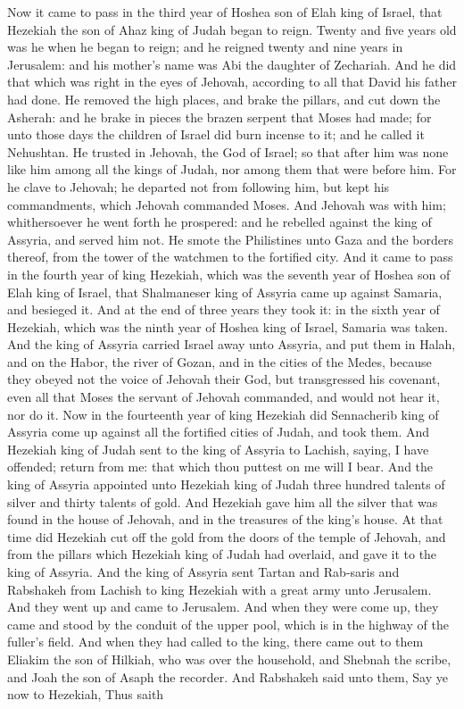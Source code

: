 Now it came to pass in the third year of Hoshea son of Elah king of Israel, that Hezekiah the son of Ahaz king of Judah began to reign. Twenty and five years old was he when he began to reign; and he reigned twenty and nine years in Jerusalem: and his mother’s name was Abi the daughter of Zechariah. And he did that which was right in the eyes of Jehovah, according to all that David his father had done. He removed the high places, and brake the pillars, and cut down the Asherah: and he brake in pieces the brazen serpent that Moses had made; for unto those days the children of Israel did burn incense to it; and he called it Nehushtan. He trusted in Jehovah, the God of Israel; so that after him was none like him among all the kings of Judah, nor among them that were before him. For he clave to Jehovah; he departed not from following him, but kept his commandments, which Jehovah commanded Moses. And Jehovah was with him; whithersoever he went forth he prospered: and he rebelled against the king of Assyria, and served him not. He smote the Philistines unto Gaza and the borders thereof, from the tower of the watchmen to the fortified city.  And it came to pass in the fourth year of king Hezekiah, which was the seventh year of Hoshea son of Elah king of Israel, that Shalmaneser king of Assyria came up against Samaria, and besieged it. And at the end of three years they took it: in the sixth year of Hezekiah, which was the ninth year of Hoshea king of Israel, Samaria was taken. And the king of Assyria carried Israel away unto Assyria, and put them in Halah, and on the Habor, the river of Gozan, and in the cities of the Medes, because they obeyed not the voice of Jehovah their God, but transgressed his covenant, even all that Moses the servant of Jehovah commanded, and would not hear it, nor do it.  Now in the fourteenth year of king Hezekiah did Sennacherib king of Assyria come up against all the fortified cities of Judah, and took them. And Hezekiah king of Judah sent to the king of Assyria to Lachish, saying, I have offended; return from me: that which thou puttest on me will I bear. And the king of Assyria appointed unto Hezekiah king of Judah three hundred talents of silver and thirty talents of gold. And Hezekiah gave him all the silver that was found in the house of Jehovah, and in the treasures of the king’s house. At that time did Hezekiah cut off the gold from the doors of the temple of Jehovah, and from the pillars which Hezekiah king of Judah had overlaid, and gave it to the king of Assyria. And the king of Assyria sent Tartan and Rab-saris and Rabshakeh from Lachish to king Hezekiah with a great army unto Jerusalem. And they went up and came to Jerusalem. And when they were come up, they came and stood by the conduit of the upper pool, which is in the highway of the fuller’s field. And when they had called to the king, there came out to them Eliakim the son of Hilkiah, who was over the household, and Shebnah the scribe, and Joah the son of Asaph the recorder.  And Rabshakeh said unto them, Say ye now to Hezekiah, Thus saith 